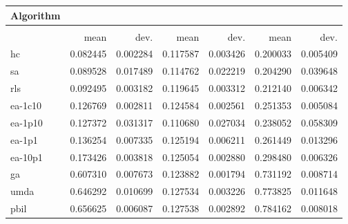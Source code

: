 \begin{tabular}{@{} l *{6}{>{{}}N{1}{2}} @{}}
\toprule
{Algorithm} &  \\
\midrule
&  &  &  \\
\midrule
& {mean} & {dev.} & {mean} & {dev.} & {mean} & {dev.} \\
\midrule
hc & 0.082445 & 0.002284 & 0.117587 & 0.003426 & 0.200033 & 0.005409 \\
sa & 0.089528 & 0.017489 & 0.114762 & 0.022219 & 0.204290 & 0.039648 \\
rls & 0.092495 & 0.003182 & 0.119645 & 0.003312 & 0.212140 & 0.006342 \\
ea-1c10 & 0.126769 & 0.002811 & 0.124584 & 0.002561 & 0.251353 & 0.005084 \\
ea-1p10 & 0.127372 & 0.031317 & 0.110680 & 0.027034 & 0.238052 & 0.058309 \\
ea-1p1 & 0.136254 & 0.007335 & 0.125194 & 0.006211 & 0.261449 & 0.013296 \\
ea-10p1 & 0.173426 & 0.003818 & 0.125054 & 0.002880 & 0.298480 & 0.006326 \\
ga & 0.607310 & 0.007673 & 0.123882 & 0.001794 & 0.731192 & 0.008714 \\
umda & 0.646292 & 0.010699 & 0.127534 & 0.003226 & 0.773825 & 0.011648 \\
pbil & 0.656625 & 0.006087 & 0.127538 & 0.002892 & 0.784162 & 0.008018 \\
\bottomrule
\end{tabular}
